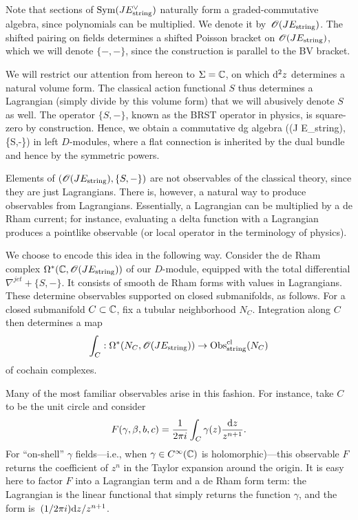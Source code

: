 Note that sections of ${\rm Sym}(J E_{\rm string}^\vee)$ naturally form a graded-commutative algebra, 
since polynomials can be multiplied.
We denote it by~$\mathscr O(J E_{\rm string})$.
The shifted pairing on fields determines a shifted Poisson bracket on $\mathscr O(J E_{\rm string})$,
which we will denote $\{-,-\}$,
since the construction is parallel to the BV bracket.

We will restrict our attention from hereon to $\Sigma = \mathbb C$,
on which ${\rm d}^2 z$ determines a natural volume form.
The classical action functional $S$ thus determines a Lagrangian (simply divide by this volume form) that we will abusively denote $S$ as well.
The operator $\{S,-\}$, known as the BRST operator in physics, is square-zero by construction.
Hence, we obtain a commutative dg algebra 
\ben
\left(\sO(J E_{\rm string}), \{S,-\}\right)
\een
in left $D$-modules,
where a flat connection is inherited by the dual bundle and hence by the symmetric powers.

Elements of $\left(\mathscr O(J E_{\rm string}), \{S,-\}\right)$ are not observables of the classical theory,
since they are just Lagrangians.
There is, however, a natural way to produce observables from Lagrangians.
Essentially, a Lagrangian can be multiplied by a de Rham current;
for instance, evaluating a delta function with a Lagrangian produces a pointlike observable
(or local operator in the terminology of physics).

We choose to encode this idea in the following way.
Consider the de Rham complex $\Omega^*(\mathbb C , \mathscr O(J E_{\rm string}))$ of our $D$-module,
equipped with the total differential $\nabla^{jet} + \{S, -\}$. 
It consists of smooth de Rham forms with values in Lagrangians.
These determine observables supported on closed submanifolds, as follows.
For a closed submanifold $C \subset \mathbb C$, 
fix a tubular neighborhood $N_C$.
Integration along $C$ then determines a map 
\begin{equation}
\label{eqn: int over C}
\int_C : \Omega^*(N_C , \mathscr O(J E_{\rm string})) \to {\rm Obs}^{{\rm cl}}_{\rm string}(N_C) 
\end{equation}
of cochain complexes.

Many of the most familiar observables arise in this fashion.
For instance, take $C$ to be the unit circle and consider
\[
F(\gamma,\beta,b,c) = \frac{1}{2\pi i}\int_C \gamma(z) \frac{{\rm d} z}{z^{n+1}}.
\]
For ``on-shell'' $\gamma$ fields---i.e., when $\gamma \in C^\infty(\mathbb C)$ is holomorphic)---this observable $F$ returns the coefficient of $z^n$ in the Taylor expansion around the origin.
It is easy here to factor $F$ into a Lagrangian term and a de Rham form term: 
the Lagrangian is the linear functional that simply returns the function $\gamma$, 
and the form is~$(1/2\pi i){\rm d} z/z^{n+1}$.

